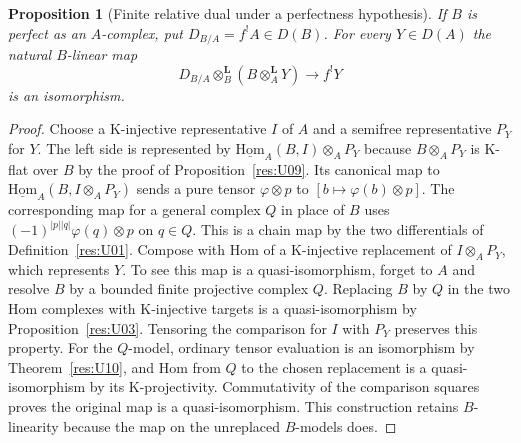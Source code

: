 \documentclass[11pt,oneside,openany]{book}
\newtheorem{proposition}[theorem]{Proposition}
\theoremstyle{definition}
\theoremstyle{remark}
\begin{document}
\begin{proposition}[Finite relative dual under a perfectness hypothesis]\label{res:U15}
If \(B\) is perfect as an \(A\)-complex, put
\(D_{B/A}=f^! A\in D(B)\).
For every \(Y\in D(A)\) the natural \(B\)-linear map
\[
 D_{B/A}\otimes_B^{\mathbf L}(B\otimes_A^{\mathbf L}Y)
     \longrightarrow f^!Y
\]
is an isomorphism.
\end{proposition}
\begin{proof}
Choose a K-injective representative \(I\) of \(A\) and a
semifree representative \(P_Y\) for \(Y\).
The left side is represented by
\(\underline{\mathrm{Hom}}_A(B,I)\otimes_A P_Y\)
because \(B\otimes_A P_Y\) is K-flat over \(B\) by the proof
of Proposition~\ref{res:U09}. Its canonical map to
\(\underline{\mathrm{Hom}}_A(B,I\otimes_A P_Y)\)
sends a pure tensor \(\varphi\otimes p\) to
\([b\mapsto\varphi(b)\otimes p]\).
The corresponding map for a general complex \(Q\) in place of
\(B\) uses \((-1)^{|p||q|}\varphi(q)\otimes p\) on \(q\in Q\).
This is a chain map by the two differentials of
Definition~\ref{res:U01}. Compose with Hom of a
K-injective replacement of \(I\otimes_A P_Y\), which represents
\(Y\). To see this map is a quasi-isomorphism, forget to
\(A\) and resolve \(B\) by a bounded finite projective complex
\(Q\). Replacing \(B\) by \(Q\) in the two Hom complexes with
K-injective targets is a quasi-isomorphism by
Proposition~\ref{res:U03}. Tensoring the comparison for \(I\)
with \(P_Y\) preserves this property. For the \(Q\)-model,
ordinary tensor evaluation is an isomorphism by
Theorem~\ref{res:U10}, and Hom from \(Q\) to the chosen
replacement is a quasi-isomorphism by its K-projectivity.
Commutativity of the comparison squares proves the original map
is a quasi-isomorphism. This construction retains \(B\)-linearity
because the map on the unreplaced \(B\)-models does.
\end{proof}
\end{document}

